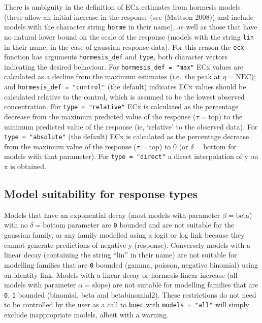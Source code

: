 \documentclass[10pt,a4paper,onecolumn]{article}
\begin{document}
There is ambiguity in the definition of ECx estimates from hormesis
models (these allow an initial increase in the response (see (Mattson
2008)) and include models with the character string \texttt{horme} in
their name), as well as those that have no natural lower bound on the
scale of the response (models with the string \texttt{lin} in their
name, in the case of gaussian response data). For this reason the
\texttt{ecx} function has arguments \texttt{hormesis\_def} and
\texttt{type}, both character vectors indicating the desired behaviour.
For \texttt{hormesis\_def\ =\ "max"} ECx values are calculated as a
decline from the maximum estimates (i.e.~the peak at
\(\eta = \text{NEC}\)); and \texttt{hormesis\_def\ =\ "control"} (the
default) indicates ECx values should be calculated relative to the
control, which is assumed to be the lowest observed concentration. For
\texttt{type\ =\ "relative"} ECx is calculated as the percentage
decrease from the maximum predicted value of the response
(\(\tau = \text{top}\)) to the minimum predicted value of the response
(ie, `relative' to the observed data). For \texttt{type\ =\ "absolute"}
(the default) ECx is calculated as the percentage decrease from the
maximum value of the response (\(\tau = \text{top}\)) to 0 (or
\(\delta = \text{bottom}\) for models with that parameter). For
\texttt{type\ =\ "direct"} a direct interpolation of y on x is obtained.

\hypertarget{model-suitability-for-response-types}{%
\subsection{Model suitability for response
types}\label{model-suitability-for-response-types}}

Models that have an exponential decay (most models with parameter
\(\beta = \text{beta}\)) with no \(\delta = \text{bottom}\) parameter
are \texttt{0} bounded and are not suitable for the gaussian family, or
any family modelled using a logit or log link because they cannot
generate predictions of negative y (response). Conversely models with a
linear decay (containing the string ``lin'' in their name) are not
suitable for modelling families that are \texttt{0} bounded (gamma,
poisson, negative binomial) using an identity link. Models with a linear
decay or hormesis linear increase (all models with parameter
\(\alpha = \text{slope}\)) are not suitable for modelling families that
are \texttt{0}, \texttt{1} bounded (binomial, beta and betabinomial2).
These restrictions do not need to be controlled by the user as a call to
\texttt{bnec} with \texttt{models\ =\ "all"} will simply exclude
inappropriate models, albeit with a warning.
\end{document}
